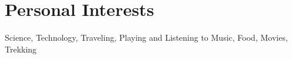\documentclass[a4paper,en,print,colorbar,colorlinks,extended]{adcv-template/adcv}
\begin{document}
  \begin{adcvlanguages}
    \adcvlanguagesheader
    \adcvlanguagesfooter
  \end{adcvlanguages}



\section{Personal Interests}\label{sec:interests}

Science, Technology, Traveling, Playing and Listening to Music, Food, Movies,
Trekking


\end{document}
